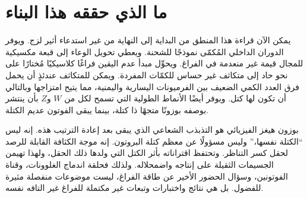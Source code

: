 \begin{classroomqa}
\end{classroomqa}

\begin{classroomqa}
\end{classroomqa}

\section{ما الذي حققه هذا البناء}

يمكن الآن قراءة هذا المنطق من البداية إلى النهاية من غير استدعاء أثير لزج. ويوفر الدوران الداخلي المُكمّى نموذجًا للشحنة. ويعطي تحويل الوعاء إلى قبعة مكسيكية للمجال قيمة غير منعدمة في الفراغ. ويحوِّل مبدأ عدم اليقين فراغًا كلاسيكيًا مُختارًا على نحو حاد إلى متكاثف غير حساس للكمّات المفردة. ويمكن للمتكاثف عندئذٍ أن يحمل فرق العدد الكمي الضعيف بين الفرميونات اليسارية واليمنية، مما يتيح امتزاجها وبالتالي أن تكون لها كتل. ويوفر أيضًا الأنماط الطولية التي تسمح لكل من $W$ و$Z$ بأن ينتشر بوصفه بوزونًا متجهًا ذا كتلة، بينما يبقى الفوتون عديم الكتلة.

بوزون هيغز الفيزيائي هو التذبذب الشعاعي الذي يبقى بعد إعادة الترتيب هذه. إنه ليس ``الكتلة نفسها،'' وليس مسؤولًا عن معظم كتلة البروتون. إنه موجة الكثافة القابلة للرصد لحقل كسر التناظر. وتحتفظ اقتراناته بأثر الكتل التي ولدها ذلك الحقل، ولهذا تهيمن الجسيمات الثقيلة على إنتاجه واضمحلاله. ولذلك فحلقة اندماج الغلوونات، وقناة الفوتونين، وسؤال الحضور الأخير عن طاقة الفراغ، ليست موضوعات منفصلة مثيرة للفضول. بل هي نتائج واختبارات وتبعات غير مكتملة للفراغ غير التافه نفسه.
